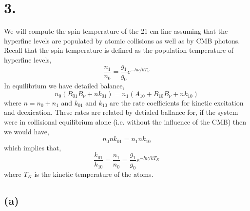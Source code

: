 \documentclass[12pt]{article}
\begin{document}
\section*{3.}

We will compute the spin temperature of the 21 cm line assuming that the hyperfine levels are populated by atomic collisions as well as by CMB photons. Recall that the spin temperature is defined as the population temperature of hyperfine levels,
\[ \frac{n_1}{n_0} = \frac{g_1}{g_0} e^{-h \nu / k T_S} \]
In equilibrium we have detailed balance,
\[ n_0 (B_{01} B_\nu + n k_{01}) = n_1 (A_{10} + B_{10} B_\nu + n k_{10}) \]
where $n = n_0 + n_1$ and $k_{01}$ and $k_{10}$ are the rate coefficients for kinetic excitation and deexication. These rates are related by detialed ballance for, if the system were in collisional equilibrium alone (i.e. without the influence of the CMB) then we would have,
\[ n_0 n k_{01} = n_1 n k_{10} \]
which implies that,
\[ \frac{k_{01}}{k_{10}} = \frac{n_1}{n_0} = \frac{g_1}{g_0} e^{- h\nu / k T_K} \]
where $T_K$ is the kinetic temperature of the atoms. 

\subsection*{(a)}
\end{document}
